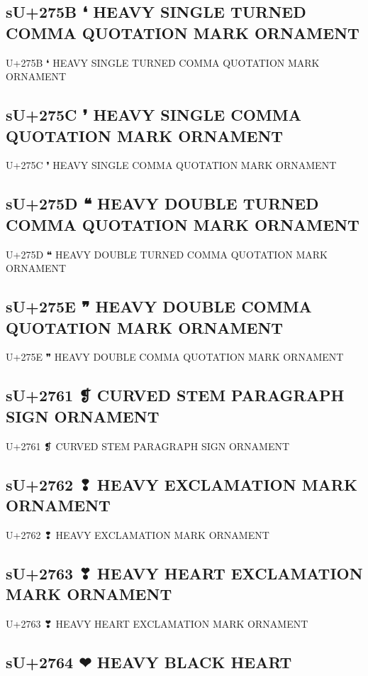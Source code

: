 \subsection{sU+275B ❛ HEAVY SINGLE TURNED COMMA QUOTATION MARK ORNAMENT}

U+275B ❛ HEAVY SINGLE TURNED COMMA QUOTATION MARK ORNAMENT

\subsection{sU+275C ❜ HEAVY SINGLE COMMA QUOTATION MARK ORNAMENT}

U+275C ❜ HEAVY SINGLE COMMA QUOTATION MARK ORNAMENT

\subsection{sU+275D ❝ HEAVY DOUBLE TURNED COMMA QUOTATION MARK ORNAMENT}

U+275D ❝ HEAVY DOUBLE TURNED COMMA QUOTATION MARK ORNAMENT

\subsection{sU+275E ❞ HEAVY DOUBLE COMMA QUOTATION MARK ORNAMENT}

U+275E ❞ HEAVY DOUBLE COMMA QUOTATION MARK ORNAMENT

\subsection{sU+2761 ❡ CURVED STEM PARAGRAPH SIGN ORNAMENT}

U+2761 ❡ CURVED STEM PARAGRAPH SIGN ORNAMENT

\subsection{sU+2762 ❢ HEAVY EXCLAMATION MARK ORNAMENT}

U+2762 ❢ HEAVY EXCLAMATION MARK ORNAMENT

\subsection{sU+2763 ❣ HEAVY HEART EXCLAMATION MARK ORNAMENT}

U+2763 ❣ HEAVY HEART EXCLAMATION MARK ORNAMENT

\subsection{sU+2764 ❤ HEAVY BLACK HEART}

